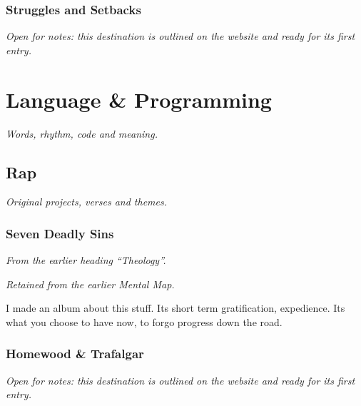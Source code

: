 \documentclass{article}
\newcounter{subsubsubsection}[subsubsection]
\begin{document}
\subsubsection{Struggles and Setbacks}\label{sec:struggles-and-setbacks}
\textit{Open for notes: this destination is outlined on the website and ready for its first entry.}

\section{Language \& Programming}\label{sec:language-and-programming}
\textit{Words, rhythm, code and meaning.}

\subsection{Rap}\label{sec:rap}
\textit{Original projects, verses and themes.}

\subsubsection{Seven Deadly Sins}\label{sec:seven-deadly-sins}

\textit{From the earlier heading ``Theology''.}

\textit{Retained from the earlier Mental Map.}

I made an album about this stuff. Its short term gratification, expedience. Its what you choose to have now, to forgo progress down the road. 







\newpage 

\subsubsection{Homewood \& Trafalgar}\label{sec:homewood-and-trafalgar}
\textit{Open for notes: this destination is outlined on the website and ready for its first entry.}
\end{document}
